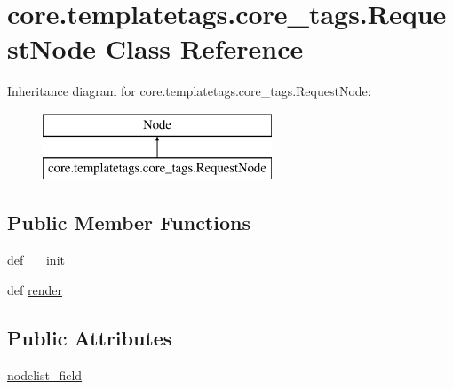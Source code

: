 \hypertarget{classcore_1_1templatetags_1_1core__tags_1_1RequestNode}{\section{core.\-templatetags.\-core\-\_\-tags.\-Request\-Node Class Reference}
\label{classcore_1_1templatetags_1_1core__tags_1_1RequestNode}
}
Inheritance diagram for core.\-templatetags.\-core\-\_\-tags.\-Request\-Node\-:\begin{figure}[H]
\begin{center}
\leavevmode
\includegraphics[height=2.000000cm]{classcore_1_1templatetags_1_1core__tags_1_1RequestNode}
\end{center}
\end{figure}
\subsection*{Public Member Functions}
\begin{DoxyCompactItemize}
\item 
def \hyperlink{classcore_1_1templatetags_1_1core__tags_1_1RequestNode_ac3376ab8191e796d84f7a498f481d165}{\-\_\-\-\_\-init\-\_\-\-\_\-}
\item 
def \hyperlink{classcore_1_1templatetags_1_1core__tags_1_1RequestNode_a2098171f856d3a327bccc591477692fc}{render}
\end{DoxyCompactItemize}
\subsection*{Public Attributes}
\begin{DoxyCompactItemize}
\item 
\hyperlink{classcore_1_1templatetags_1_1core__tags_1_1RequestNode_aa9704d30f35d2b11b9e2d11576ec2406}{nodelist\-\_\-field}
\end{DoxyCompactItemize}


